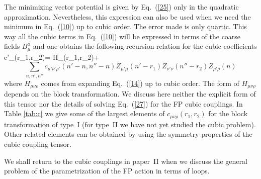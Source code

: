 The minimizing vector potential is given by Eq.~(\ref{25})  only in the 
quadratic approximation. Nevertheless, this expression can also be used 
when we need the minimum in Eq.~(\ref{10}) up to cubic order. The error made
is only quartic. This way all the cubic terms in Eq.~(\ref{10}) will 
be expressed in terms of the coarse fields $B^a_{\mu}$ and one obtains 
the following recursion relation for the cubic coefficients
\bee
c'_{\mu\nu\rho}(r_1,r_2)= \kappa H_{\mu\nu\rho}(r_1,r_2)+    \label{27}
\ee
$$
  \sum_{n,n',n''} c_{\mu' \nu' \rho'}(n'-n,n''-n) Z_{\mu'\mu}(n'-r_1)
Z_{\nu'\nu}(n''-r_2) Z_{\rho'\rho}(n)
$$
where $H_{\mu\nu\rho}$ comes from expanding Eq.~(\ref{14}) up to
cubic order. The form of $H_{\mu\nu\rho}$ depends on the block 
transformation.
We discuss here neither the explicit form of this tensor nor the details
of solving Eq.~(\ref{27}) for the FP cubic couplings.
In Table \ref{tab:c} we give some of the largest elements of 
$c_{\mu\nu\rho}(r_1,r_2)$ for the block transformation of type~I
(for type~II we have not yet studied the cubic problem). 
Other related elements can be obtained by using the symmetry
properties of the cubic coupling tensor.

We shall return to the cubic couplings in paper~II when we
discuss the general  problem of the parametrization of the FP action in 
terms of loops.

